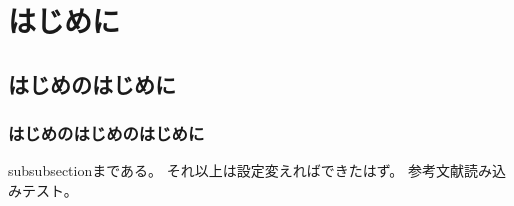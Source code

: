 \section{はじめに}
\subsection{はじめのはじめに}
\subsubsection{はじめのはじめのはじめに}
subsubsectionまである。
それ以上は設定変えればできたはず。
参考文献読み込みテスト。\cite{参考文献ラベル} 